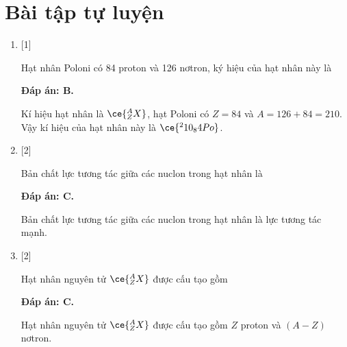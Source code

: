 \section{Bài tập tự luyện}
\begin{enumerate}[label=\bfseries Câu \arabic*:]
	\item {} [1]
	\cauhoi
	{Hạt nhân Poloni có 84 proton và 126 nơtron, ký hiệu của hạt nhân này là
	}
	
	\loigiai
	{		\textbf{Đáp án: B.}
		
		Kí hiệu hạt nhân là $\ce{^A_Z X}$, hạt Poloni có $Z=84$ và $A=126+84=210$. Vậy kí hiệu của hạt nhân này là $\ce{^210_84 Po}$.
		
	}
	
	\item {} [2]
	\cauhoi
	{Bản chất lực tương tác giữa các nuclon trong hạt nhân là
	}
	
	\loigiai
	{		\textbf{Đáp án: C.}
		
		Bản chất lực tương tác giữa các nuclon trong hạt nhân là lực tương tác mạnh.
		
	}
	
	\item {} [2]
	\cauhoi
	{Hạt nhân nguyên tử $\ce{^A_Z X}$ được cấu tạo gồm
	}
	
	\loigiai
	{		\textbf{Đáp án: C.}
		
		Hạt nhân nguyên tử $\ce{^A_Z X}$ được cấu tạo gồm $Z$ proton và $(A-Z)$ nơtron.
		
}
\end{enumerate}
